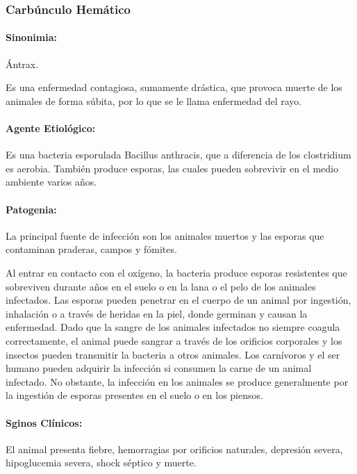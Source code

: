        \subsubsection{Carbúnculo Hemático}

            \paragraph{Sinonimia:} Ántrax.

            Es una enfermedad contagiosa, sumamente drástica, que provoca muerte de los animales de forma súbita, por lo que se le llama enfermedad del rayo.

            \paragraph{Agente Etiológico:} Es una bacteria esporulada Bacillus anthracis, que a diferencia de los clostridium es aerobia. También produce esporas, las cuales pueden sobrevivir en el medio ambiente varios años.

            \paragraph{Patogenia:} La principal fuente de infección son los animales muertos y las esporas que contaminan praderas, campos y fómites.

            Al entrar en contacto con el oxígeno, la bacteria produce esporas resistentes que sobreviven durante años en el suelo o en la lana o el pelo de los animales infectados. Las esporas pueden penetrar en el cuerpo de un animal por ingestión, inhalación o a través de heridas en la piel, donde germinan y causan la enfermedad. Dado que la sangre de los animales infectados no siempre coagula correctamente, el animal puede sangrar a través de los orificios corporales y los insectos pueden transmitir la bacteria a otros animales. Los carnívoros y el ser humano pueden adquirir la infección si consumen la carne de un animal infectado. No obstante, la infección en los animales se produce generalmente por la ingestión de esporas presentes en el suelo o en los piensos.

            \paragraph{Sginos Clínicos:} El animal presenta fiebre, hemorragias por orificios naturales, depresión severa, hipoglucemia severa, shock séptico y muerte.

